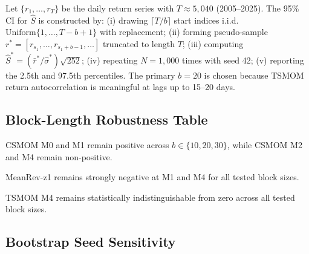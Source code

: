 \documentclass[12pt]{article}
\begin{document}
Let $\{r_1, \ldots, r_T\}$ be the daily return series with
$T \approx 5{,}040$ (2005--2025). The 95\% CI for $\hat S$ is
constructed by: (i) drawing $\lceil T/b \rceil$ start indices i.i.d.
$\mathrm{Uniform}\{1, \ldots, T{-}b{+}1\}$ with replacement;
(ii) forming pseudo-sample $r^* = [r_{s_1}, \ldots, r_{s_1+b-1},
\ldots]$ truncated to length $T$;
(iii) computing $\hat S^* = (\bar r^*/\hat\sigma^*)\sqrt{252}$;
(iv) repeating $N = 1{,}000$ times with seed 42; (v) reporting the
2.5th and 97.5th percentiles. The primary $b = 20$ is chosen because
TSMOM return autocorrelation is meaningful at lags up to 15--20 days.

\subsection{Block-Length Robustness Table}

\begin{table}[H]
\centering
\caption{Bootstrap CI sensitivity to block length $b \in \{10,20,30\}$.
$N = 1{,}000$ resamples, seed 42. Primary results in this paper use
$b = 20$. $b = 10$ CIs are $\approx 8\%$ narrower; $b = 30$ CIs are
$\approx 6\%$ wider than $b = 20$. Qualitative tier ordering remains
stable across tested block lengths.}
\label{tab:bootstrap_sensitivity}
\small

\begin{tablenotes}\small
\item CSMOM M0 and M1 remain positive across $b \in \{10,20,30\}$,
while CSMOM M2 and M4 remain non-positive.
\item MeanRev-z1 remains strongly negative at M1 and M4 for all tested
block sizes.
\item TSMOM M4 remains statistically indistinguishable from zero across
all tested block sizes.
\end{tablenotes}
\end{table}

\subsection{Bootstrap Seed Sensitivity}
\label{app:seed_sensitivity}
\end{document}
